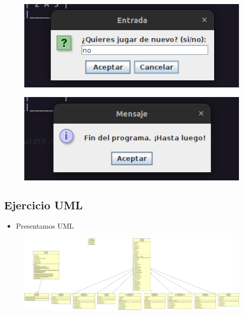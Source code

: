 \documentclass{article}
\begin{document}
	\begin{figure}[H]
		\centering
		\includegraphics[width=1.0\textwidth,keepaspectratio]{img/Commit12-3.png}
	\end{figure}
	\begin{figure}[H]
		\centering
		\includegraphics[width=1.0\textwidth,keepaspectratio]{img/Commit12-4.png}
	\end{figure}
	\subsection{Ejercicio UML}
	\begin{itemize}	
		\item Presentamos UML
	\end{itemize}
	\begin{figure}[H]
		\centering
		\includegraphics[width=1.0\textwidth,keepaspectratio]{img/UML.PNG}
	\end{figure}
\end{document}
